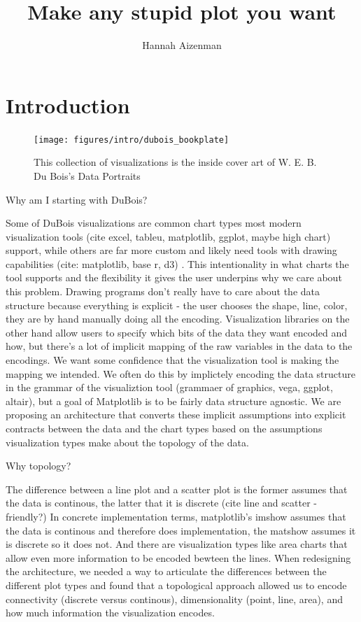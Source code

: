 \documentclass[letterpaper,onecolumn,titlepage]{Ythesis}
\title{Make any stupid plot you want}
\author{Hannah Aizenman}
\begin{document}
\makefrontmatter

\section{Introduction}
\label{sec:introduction}
\begin{figure}
    \texttt{[image: figures/intro/dubois\_bookplate]}
    \caption{This collection of visualizations is the inside cover art of W. E. B. Du Bois's Data Portraits\cite{duboiscenterattheuniversityofmassachusettsBoisDataPortraits2018}}
    \label{fig:dubois_bookplate}
\end{figure}

Why am I starting with DuBois? 

 Some of DuBois visualizations are common chart types most modern visualization tools (cite excel, tableu, matplotlib, ggplot, maybe high chart) support, while others are far more custom and likely need tools with drawing capabilities (cite: matplotlib, base r, d3) \cite{duboiscenterattheuniversityofmassachusettsBoisDataPortraits2018}. This intentionality in what charts the tool supports and the flexibility it gives the user underpins why we care about this problem. Drawing programs don't really have to care about the data structure because everything is explicit - the user chooses the shape, line, color, they are by hand manually doing all the encoding. Visualization libraries on the other hand allow users to specify which bits of the data they want encoded and how, but there's a lot of implicit mapping of the raw variables in the data to the encodings. We want some confidence that the visualization tool is making the mapping we intended. We often do this by implictely encoding the data structure in the grammar of the visualiztion tool (grammaer of graphics, vega, ggplot, altair), but a goal of Matplotlib \cite{huntermatplotlib2007} is to be fairly data structure agnostic. We are proposing an architecture that converts these implicit assumptions into explicit contracts between the data and the chart types based on the assumptions visualization types make about the topology of the data. 

 Why topology?

 The difference between a line plot and a scatter plot is the former assumes that the data is continous, the latter that it is discrete (cite line and scatter - friendly?) In concrete implementation terms, matplotlib's imshow assumes that the data is continous and therefore does implementation, the matshow assumes it is discrete so it does not. And there are visualization types like area charts that allow even more information to be encoded bewteen the lines. When redesigning the architecture, we needed a way to articulate the differences between the different plot types and found that a topological approach allowed us to encode connectivity (discrete versus continous), dimensionality (point, line, area), and how much information the visualization encodes. 
\end{document}
